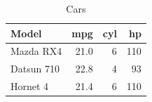 \begin{table}

\caption{Cars}
\centering
\begin{tabular}[t]{lrrr}
\toprule
Model & mpg & cyl & hp\\
\midrule
Mazda RX4 & 21.0 & 6 & 110\\
Datsun 710 & 22.8 & 4 & 93\\
Hornet 4 & 21.4 & 6 & 110\\
\bottomrule
\end{tabular}
\end{table}
